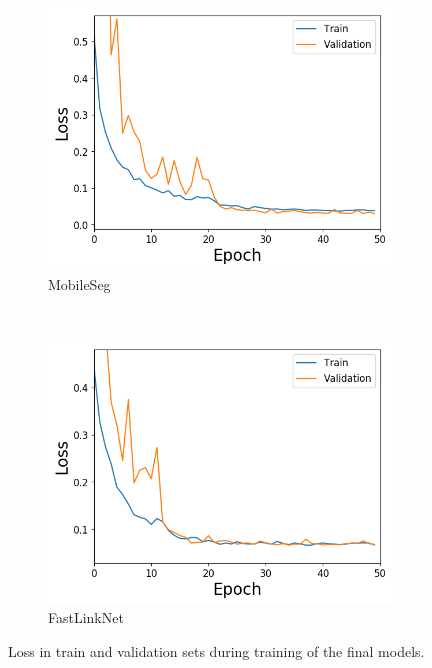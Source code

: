 \documentclass{kththesis}
\begin{document}
\begin{figure}[h]
    \begin{subfigure}[b]{0.45\textwidth}
        \includegraphics[width=\textwidth]{train_MobileSeg_CrossEntropy}
        \caption{MobileSeg}
        \label{fig:train_MobileSeg}
    \end{subfigure}
    ~ %
    \begin{subfigure}[b]{0.45\textwidth}
        \includegraphics[width=\textwidth]{train_FastLinkNet3_IoU}
        \caption{FastLinkNet}
        \label{fig:train_FastLinkNet}
    \end{subfigure}
    \caption{Loss in train and validation sets during training of the final
      models.}\label{fig:training}
\end{figure}
\end{document}
